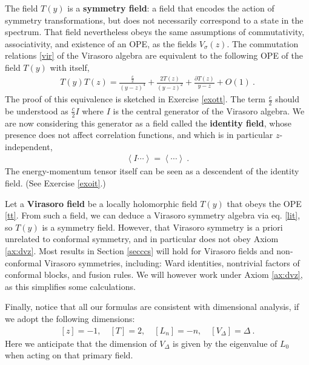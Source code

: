 \documentclass[12pt, a4paper, notitlepage, twoside]{report}
\numberwithin{equation}{section}
\theoremstyle{break}
\begin{document}
The field $T(y)$ is a \textbf{\boldmath symmetry field}: a field that encodes the action of symmetry transformations, but does not necessarily correspond to a state in the spectrum. 
That field nevertheless obeys the same assumptions of commutativity, associativity, and existence of an OPE, as the fields $V_\sigma(z)$.
The commutation relations \eqref{vir} of the Virasoro algebra are equivalent to the following OPE of the field $T(y)$ with itself,
\begin{align}
 \boxed{T(y)T(z) = \frac{\frac{c}{2}}{(y-z)^4} + \frac{2T(z)}{(y-z)^2} + \frac{\partial T(z)}{y-z} + O(1)}\ .
\label{tt}
\end{align}
The proof of this equivalence is sketched in Exercise \ref{exott}. 
The term $\frac{c}{2}$ should be understood as $\frac{c}{2}I$ where $I$ is the
central generator of the Virasoro algebra.
We are now considering this generator as a field called the 
\textbf{\boldmath identity field}, whose presence does not affect correlation functions, and which is in particular $z$-independent,
\begin{align}
 \left\langle I \cdots \right\rangle = \left\langle \cdots \right\rangle \ .
\label{ivac}
\end{align}
The energy-momentum tensor itself can be seen as a descendent of the identity field. (See Exercise \ref{exoit}.)

Let a \textbf{Virasoro field} be a locally holomorphic field $T(y)$ that obeys the OPE \eqref{tt}. 
From such a field, we can deduce a Virasoro symmetry algebra via eq. \eqref{lit}, so $T(y)$ is a symmetry field. However, that Virasoro symmetry is a priori unrelated to conformal symmetry, and in particular does not obey Axiom \ref{ax:dvz}. 
Most results in Section \ref{secccs} will hold for Virasoro fields and non-conformal Virasoro symmetries, including: Ward identities, nontrivial factors of conformal blocks, and fusion rules. We will however work under Axiom \ref{ax:dvz}, as this simplifies some calculations.

Finally, notice that all our formulas are consistent with dimensional analysis, if we adopt the following dimensions:
\begin{align}
 \boxed{[z]=-1,\quad [T]=2, \quad [L_n]=-n, \quad [V_\Delta]=\Delta}\ .
\label{zaz}
\end{align}
Here we anticipate that the dimension of $V_\Delta$ is given by the eigenvalue of $L_0$ when acting on that primary field.
\end{document}
